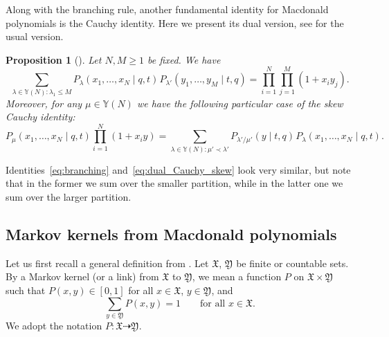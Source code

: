 \documentclass[11pt]{article}
\numberwithin{equation}{section}
\numberwithin{equation}{section}
\newtheorem{Proposition}[Theorem]{Proposition}
{ \theoremstyle{definition}
\newtheorem{Definition}[Theorem]{Definition}}
\begin{document}
Along with the branching rule, another fundamental
identity for Macdonald polynomials is the Cauchy identity.
Here we present its dual version, see \cite[Chapter~VI.4]{Macdonald1995} for the
usual version.

\begin{Proposition}[{\cite[formula~(VI.5.4) and Chapter~VI.7]{Macdonald1995}}]
	\label{prop:dual_Cauchy_identity}
	Let $N,M\ge 1$ be fixed. We have
	\begin{equation*}%
		\sum_{\lambda\in \mathbb{Y}(N)\colon \lambda_1\le M}
		P_\lambda(x_1,\dots,x_N \mid q,t)
		\hspace{1pt}
		P_{\lambda'}(y_1,\dots,y_M\mid t,q )=
		\prod_{i=1}^{N}\prod_{j=1}^{M}(1+x_iy_j).
	\end{equation*}
	Moreover, for any $\mu\in \mathbb{Y}(N)$ we have
	the following particular case of
	the skew Cauchy identity:
	\begin{equation}		\label{eq:dual_Cauchy_skew}
		P_\mu(x_1,\dots,x_N\mid q,t )
		\prod_{i=1}^{N}(1+x_iy)=
		\sum_{\lambda\in \mathbb{Y}(N)\colon \mu'\prec \lambda'}
		P_{\lambda'/\mu'}(y\mid t,q)
		\hspace{1pt}
		P_\lambda(x_1,\dots,x_N\mid q,t ).
	\end{equation}
\end{Proposition}
Identities~\eqref{eq:branching} and~\eqref{eq:dual_Cauchy_skew} look very similar, but note that
in the former we sum over the smaller partition, while in the latter one we sum over the larger partition.

\subsection{Markov kernels from Macdonald polynomials}\label{eq:Markov_kernels_from_Cauchy}

Let us first recall a general definition from
\cite[Chapter~7]{borodin2016representations}.
Let $\mathfrak{X}$, $\mathfrak{Y}$ be
finite or countable sets. By a Markov kernel
(or a link) from $\mathfrak{X}$ to $\mathfrak{Y}$,
we mean a function $P$ on $\mathfrak{X}\times \mathfrak{Y}$
such that
$P(x,y)\in[0,1]$ for all $x\in \mathfrak{X}$, $y\in \mathfrak{Y}$,
and
\begin{equation*}
	\sum_{y\in \mathfrak{Y}}P(x,y)=1
	\qquad
	\text{for all $x\in \mathfrak{X}$}.
\end{equation*}
We adopt the notation $P\colon \mathfrak{X}\dashrightarrow \mathfrak{Y}$.
\end{document}
